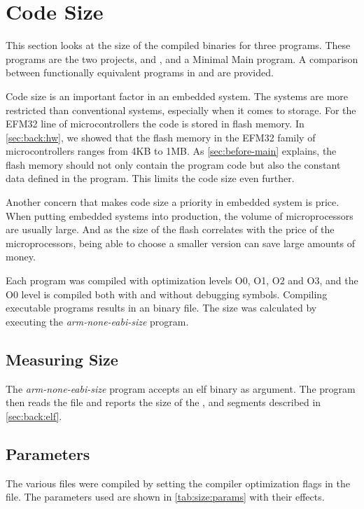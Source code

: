 \section{Code Size}
\label{sec:res:code-size}

This section looks at the size of the compiled binaries for three {\rust} programs.
These programs are the two projects, {\tracker} and {\cg}, and a Minimal Main program.
A comparison between functionally equivalent programs in {\C} and {\rust} are provided.

Code size is an important factor in an embedded system.
The systems are more restricted than conventional systems, especially when it comes to storage.
For the EFM32 line of microcontrollers the code is stored in flash memory.
In \autoref{sec:back:hw}, we showed that the flash memory in the EFM32 family of microcontrollers ranges from 4KB to 1MB.
As \autoref{sec:before-main} explains, the flash memory should not only contain the program code but also the constant data defined in the program.
This limits the code size even further.

Another concern that makes code size a priority in embedded system is price.
When putting embedded systems into production, the volume of microprocessors are usually large.
And as the size of the flash correlates with the price of the microprocessors, being able to choose a smaller version can save large amounts of money.

Each program was compiled with optimization levels O0, O1, O2 and O3, and the O0 level is compiled both with and without debugging symbols.
Compiling executable programs results in an {\elf} binary file.
The size was calculated by executing the \emph{arm-none-eabi-size} program.

\subsection{Measuring Size}
\label{sec:measure-size}

The \emph{arm-none-eabi-size} program accepts an elf binary as argument.
The program then reads the file and reports the size of the ,  and  segments described in \autoref{sec:back:elf}.

\subsection{Parameters}
\label{sec:size:params}
The various files were compiled by setting the compiler optimization flags in the  file.
The parameters used are shown in \autoref{tab:size:params} with their effects.

